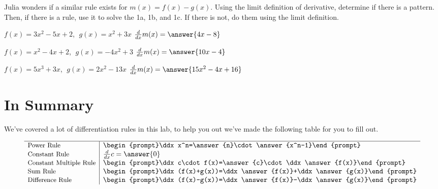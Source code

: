\documentclass{ximera}
\begin{document}
\begin{question}
Julia wonders if a similar rule exists for $m(x) = f(x)-g(x)$. Using the limit definition of derivative, determine if there is a pattern. Then, if there is a rule, use it to solve the 1a, 1b, and 1c. If there is not, do them using the limit definition.

$f(x) = 3x^2 - 5x + 2$, $\;g(x) = x^2 + 3x$ \hspace{11mm} $\frac{d}{dx}m(x) =  \answer{4x-8}$

$f(x) = x^2 - 4x + 2$, $\;g(x) = -4x^2 + 3$ \hspace{10mm} $\frac{d}{dx}m(x) =  \answer{10x-4}$

$f(x) = 5x^3 + 3x$, $\;g(x) = 2x^2 - 13x$ \hspace{13mm} $\frac{d}{dx}m(x) =  \answer{15x^2-4x+16}$
\end{question}
\section{In Summary}
We've covered a lot of differentiation rules in this lab, to help you out we've made the following table for you to fill out.
\begin{question}
\[
\begin{array}{l|l}
\hline
  \small\text{Power Rule}&\begin{prompt}\ddx x^n=\answer{n}\cdot\answer{x^n-1}\end{prompt}\\
  \small\text{Constant Rule} & \ddx c=\answer{0}\\
  \small\text{Constant Multiple Rule} & \begin{prompt}\ddx c\cdot f(x)=\answer{c}\cdot\ddx \answer{f(x)}\end{prompt}\\
  \small\text{Sum Rule} & \begin{prompt}\ddx (f(x)+g(x))=\ddx \answer{f(x)}+\ddx \answer{g(x)}\end{prompt}\\
  \small\text{Difference Rule} & \begin{prompt}\ddx (f(x)-g(x))=\ddx \answer{f(x)}-\ddx \answer{g(x)}\end{prompt}
\end{array}
\]
\end{question}

\pagebreak
\end{document}
